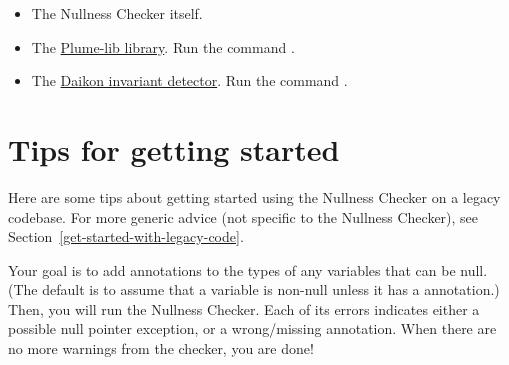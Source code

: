 \begin{itemize}
\item
The Nullness Checker itself.

\item
The
\href{https://mernst.github.io/plume-lib/}{Plume-lib library}.
Run the command .


\item
The
\href{http://plse.cs.washington.edu/daikon/}{Daikon invariant detector}.
Run the command .

%
%
%

\end{itemize}


\section{Tips for getting started\label{nullness-getting-started}}

Here are some tips about getting started using the Nullness Checker on a
legacy codebase.  For more generic advice (not specific to the Nullness
Checker), see Section~\ref{get-started-with-legacy-code}.

Your goal is to add  annotations
to the types of any variables that can be null.  (The default is to assume
that a variable is non-null unless it has a  annotation.)
Then, you will run the Nullness Checker.  Each of its errors indicates
either a possible null pointer exception, or a wrong/missing annotation.
When there are no more warnings from the checker, you are done!

